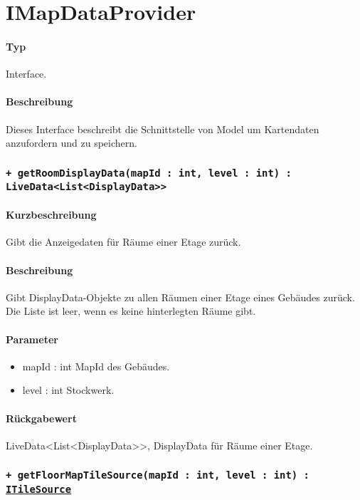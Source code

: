 \section{IMapDataProvider}
\paragraph*{Typ}
Interface.
\paragraph*{Beschreibung}
Dieses Interface beschreibt die Schnittstelle von Model um Kartendaten anzufordern und zu speichern.

\subsubsection{\texttt{+ getRoomDisplayData(mapId : int, level : int) : LiveData<List<DisplayData>>}}%
\paragraph*{Kurzbeschreibung}
Gibt die Anzeigedaten für Räume einer Etage zurück.
\paragraph*{Beschreibung}
Gibt DisplayData-Objekte zu allen Räumen einer Etage eines Gebäudes zurück.\\
Die Liste ist leer, wenn es keine hinterlegten Räume gibt.
\paragraph*{Parameter}
\begin{itemize}
    \item mapId : int MapId des Gebäudes.
    \item level : int Stockwerk.
\end{itemize}
\paragraph*{Rückgabewert}
LiveData<List<DisplayData>>, DisplayData für Räume einer Etage.

\subsubsection{\texttt{+ getFloorMapTileSource(mapId : int, level : int) : \href{https://osmdroid.github.io/osmdroid/javadocAll/org/osmdroid/tileprovider/tilesource/ITileSource.html}
{ITileSource}}}%
